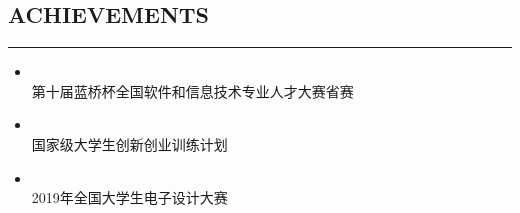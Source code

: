 \documentclass[11 pt, a4paper, usenames, dvipsnames]{article}
\newcommand*{\AchFont}{%
      \fontsize{11}{8}%
\color{Gray}%
      \selectfont}
\newcommand*{\SectionFont}{%
      \fontsize{16}{5}%
\color{CV_Color}%
\bf
\selectfont}
\begin{document}
\begin{paracol}{2}
\section*{\SectionFont\faTrophy\enskip ACHIEVEMENTS}\vspace{-15pt}
\par\noindent\rule{0.26\textwidth}{0.4pt}
\begin{itemize}[leftmargin=0pt,align=left,labelwidth=\parindent,labelsep=0pt]
	
\item[] \href{http://dasai.lanqiao.cn/pages/dasai/index.html}{} \\
{\AchFont 第十届蓝桥杯全国软件和信息技术专业人才大赛省赛}


\item[] \href{http://gjcxcy.bjtu.edu.cn/Index.aspx}{} \\
{\AchFont 国家级大学生创新创业训练计划}

\item[] \href{https://www.nuedc-training.com.cn/}{} \\
{\AchFont 2019年全国大学生电子设计大赛  }

\end {itemize}
\vspace{-0.2em}

\end{paracol}
\end{document}
